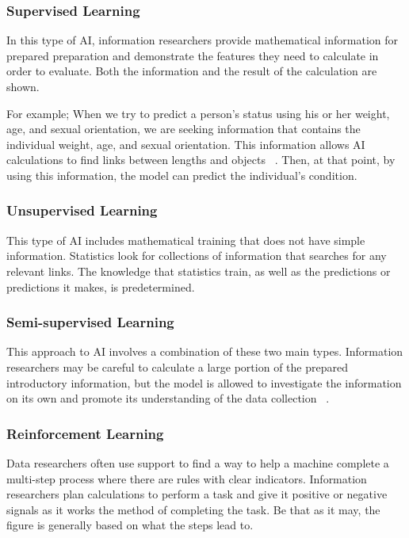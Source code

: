 \documentclass[10pt]{aa}
\begin{document}
\subsubsection{Supervised Learning}
In this type of AI, information researchers provide mathematical information for prepared preparation and demonstrate the features they need to calculate in order to evaluate. Both the information and the result of the calculation are shown.

For example; When we try to predict a person's status using his or her weight, age, and sexual orientation, we are seeking information that contains the individual weight, age, and sexual orientation. This information allows AI calculations to find links between lengths and objects ~\cite{yuan_2020_learning}. Then, at that point, by using this information, the model can predict the individual's condition.

\subsubsection{Unsupervised Learning}
This type of AI includes mathematical training that does not have simple information. Statistics look for collections of information that searches for any relevant links. The knowledge that statistics train, as well as the predictions or predictions it makes, is predetermined.

\subsubsection {Semi-supervised Learning}
This approach to AI involves a combination of these two main types. Information researchers may be careful to calculate a large portion of the prepared introductory information, but the model is allowed to investigate the information on its own and promote its understanding of the data collection ~\cite{senaviratna_2019_diagnosing}.

\subsubsection{Reinforcement Learning}
Data researchers often use support to find a way to help a machine complete a multi-step process where there are rules with clear indicators. Information researchers plan calculations to perform a task and give it positive or negative signals as it works the method of completing the task. Be that as it may, the figure is generally based on what the steps lead to.
\end{document}
